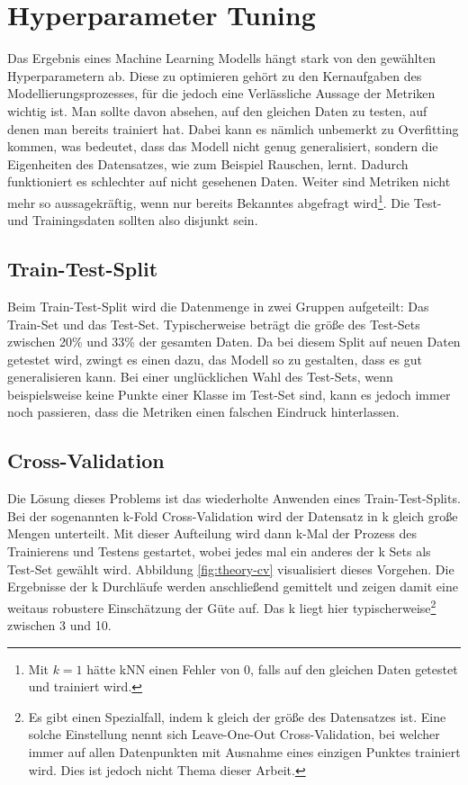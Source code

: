 \section{Hyperparameter Tuning \label{Section-HyperTuning}}

Das Ergebnis eines Machine Learning Modells hängt stark von den gewählten Hyperparametern ab. Diese zu
 optimieren gehört zu den Kernaufgaben des Modellierungsprozesses, für die jedoch eine Verlässliche Aussage
 der Metriken wichtig ist. Man sollte davon absehen, auf den gleichen Daten zu testen, auf denen man bereits
 trainiert hat. Dabei kann es nämlich unbemerkt zu Overfitting kommen, was bedeutet, dass das Modell nicht
 genug generalisiert, sondern die Eigenheiten des Datensatzes, wie zum Beispiel Rauschen, lernt. Dadurch
 funktioniert es schlechter auf nicht gesehenen Daten. Weiter sind Metriken nicht mehr so aussagekräftig,
 wenn nur bereits Bekanntes abgefragt wird\footnote{Mit $k=1$ hätte kNN einen Fehler von $0$, falls auf den
 gleichen Daten getestet und trainiert wird.}. Die Test- und Trainingsdaten sollten also disjunkt sein.

\subsection*{Train-Test-Split}

Beim Train-Test-Split wird die Datenmenge in zwei Gruppen aufgeteilt: Das Train-Set und das Test-Set.
 Typischerweise beträgt die größe des Test-Sets zwischen 20\% und 33\% der gesamten Daten. Da bei diesem Split
 auf neuen Daten getestet wird, zwingt es einen dazu, das Modell so zu gestalten, dass es gut generalisieren
 kann. Bei einer unglücklichen Wahl des Test-Sets, wenn beispielsweise keine Punkte einer Klasse im Test-Set sind,
 kann es jedoch immer noch passieren, dass die Metriken einen falschen Eindruck hinterlassen.

\subsection*{Cross-Validation}

Die Lösung dieses Problems ist das wiederholte Anwenden eines Train-Test-Splits. Bei der sogenannten
 k-Fold Cross-Validation wird der Datensatz in k gleich große Mengen unterteilt. Mit dieser Aufteilung
 wird dann k-Mal der Prozess des Trainierens und Testens gestartet, wobei jedes mal ein anderes der k Sets als
 Test-Set gewählt wird. Abbildung \ref{fig:theory-cv} visualisiert dieses Vorgehen. Die Ergebnisse der k Durchläufe
 werden anschließend gemittelt und zeigen damit eine weitaus robustere Einschätzung der Güte auf. Das k liegt hier
 typischerweise\footnote{Es gibt einen Spezialfall, indem k gleich der größe des Datensatzes ist. Eine solche
 Einstellung nennt sich Leave-One-Out Cross-Validation, bei welcher immer auf allen Datenpunkten mit Ausnahme
 eines einzigen Punktes trainiert wird. Dies ist jedoch nicht Thema dieser Arbeit.} zwischen 3 und 10.

